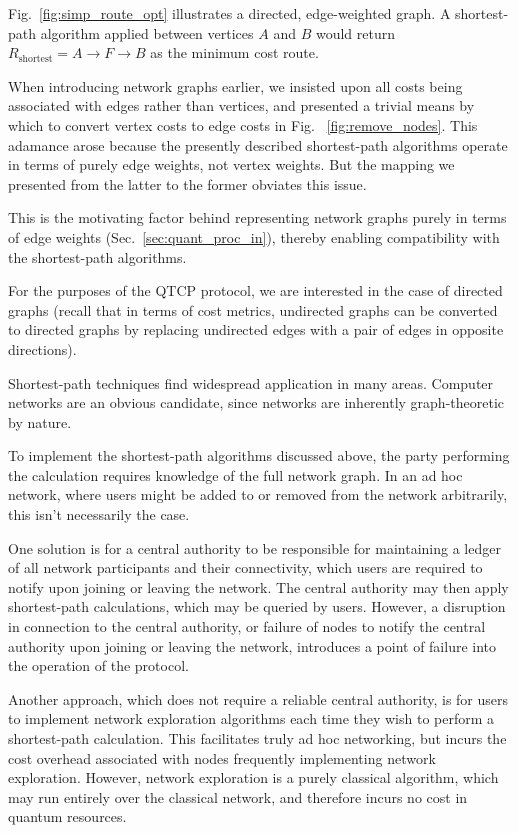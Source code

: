 \documentclass[aps,rmp,twocolumn,amsmath,amssymb,nofootinbib,superscriptaddress,longbibliography,floatfix]{revtex4-1}
\begin{document}
Fig.~\ref{fig:simp_route_opt} illustrates a directed, edge-weighted graph. A shortest-path algorithm applied between vertices $A$ and $B$ would return \mbox{$R_\mathrm{shortest} = A\to F\to B$} as the minimum cost route.

When introducing network graphs earlier, we insisted upon all costs being associated with edges rather than vertices, and presented a trivial means by which to convert vertex costs to edge costs in Fig.~ \ref{fig:remove_nodes}. This adamance arose because the presently described shortest-path algorithms operate in terms of purely edge weights, not vertex weights. But the mapping we presented from the latter to the former obviates this issue.

This is the motivating factor behind representing network graphs purely in terms of edge weights (Sec.~\ref{sec:quant_proc_in}), thereby enabling compatibility with the shortest-path algorithms.

For the purposes of the QTCP protocol, we are interested in the case of directed graphs (recall that in terms of cost metrics, undirected graphs can be converted to directed graphs by replacing undirected edges with a pair of edges in opposite directions).

Shortest-path techniques find widespread application in many areas. Computer networks are an obvious candidate, since networks are inherently graph-theoretic by nature.

To implement the shortest-path algorithms discussed above, the party performing the calculation requires knowledge of the full network graph. In an ad hoc network, where users might be added to or removed from the network arbitrarily, this isn't necessarily the case.

One solution is for a central authority to be responsible for maintaining a ledger of all network participants and their connectivity, which users are required to notify upon joining or leaving the network. The central authority may then apply shortest-path calculations, which may be queried by users. However, a disruption in connection to the central authority, or failure of nodes to notify the central authority upon joining or leaving the network, introduces a point of failure into the operation of the protocol.

Another approach, which does not require a reliable central authority, is for users to implement network exploration algorithms each time they wish to perform a shortest-path calculation. This facilitates truly ad hoc networking, but incurs the cost overhead associated with nodes frequently implementing network exploration. However, network exploration is a purely classical algorithm, which may run entirely over the classical network, and therefore incurs no cost in quantum resources.
\end{document}
